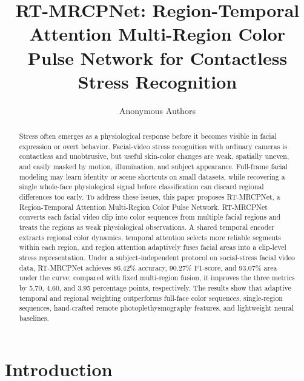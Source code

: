 \documentclass[runningheads]{llncs}
\begin{document}
\title{RT-MRCPNet: Region-Temporal Attention Multi-Region Color Pulse Network for Contactless Stress Recognition}

\author{Anonymous Authors}

\maketitle

\begin{abstract}
Stress often emerges as a physiological response before it becomes visible in facial expression or overt behavior. Facial-video stress recognition with ordinary cameras is contactless and unobtrusive, but useful skin-color changes are weak, spatially uneven, and easily masked by motion, illumination, and subject appearance. Full-frame facial modeling may learn identity or scene shortcuts on small datasets, while recovering a single whole-face physiological signal before classification can discard regional differences too early. To address these issues, this paper proposes RT-MRCPNet, a Region-Temporal Attention Multi-Region Color Pulse Network. RT-MRCPNet converts each facial video clip into color sequences from multiple facial regions and treats the regions as weak physiological observations. A shared temporal encoder extracts regional color dynamics, temporal attention selects more reliable segments within each region, and region attention adaptively fuses facial areas into a clip-level stress representation. Under a subject-independent protocol on social-stress facial video data, RT-MRCPNet achieves 86.42\% accuracy, 90.27\% F1-score, and 93.07\% area under the curve; compared with fixed multi-region fusion, it improves the three metrics by 5.70, 4.60, and 3.95 percentage points, respectively. The results show that adaptive temporal and regional weighting outperforms full-face color sequences, single-region sequences, hand-crafted remote photoplethysmography features, and lightweight neural baselines.

\end{abstract}

\section{Introduction}
\end{document}
